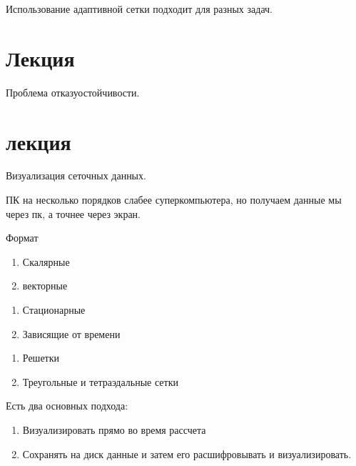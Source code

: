 \documentclass[14pt]{extarticle}
\begin{document}
Использование адаптивной сетки подходит для разных задач.

\section{Лекция}

Проблема отказуостойчивости.

\section{лекция}

Визуализация сеточных данных.

ПК на несколько порядков слабее суперкомпьютера, но получаем данные мы через пк, а точнее через экран.

Формат
\begin{enumerate}
	\item Скалярные
	\item векторные
\end{enumerate}

\begin{enumerate}
	\item Стационарные
	\item Зависящие от времени
\end{enumerate}

\begin{enumerate}
	\item Решетки
	\item Треугольные и тетраэдальные сетки
\end{enumerate}

Есть два основных подхода:
\begin{enumerate}
	\item Визуализировать прямо во время рассчета
	\item Сохранять на диск данные и затем его расшифровывать и визуализировать.
\end{enumerate}
\end{document}
